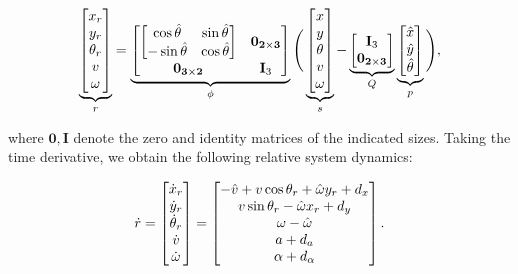 \begin{equation}\small
\label{eq:5D_and_3D_err_state}
\underbrace{
\begin{bmatrix}
x_r\\
y_r\\
\theta_r \\
v \\
\omega
\end{bmatrix}
}_\rstate
=
\underbrace{
\begin{bmatrix}
  \begin{bmatrix}
  \cos\hat\theta & \sin\hat\theta \\
  -\sin\hat\theta & \cos\hat\theta
  \end{bmatrix} & \mathbf{0_{2\times 3}} \\
  \mathbf{0_{3\times 2}} & \mathbf I_3
\end{bmatrix}
}_\rtrans
\Bigg(
\underbrace{
\begin{bmatrix}
x\\
y\\
\theta \\
v \\
\omega
\end{bmatrix}
}_\tstate -
\underbrace{
\begin{bmatrix}
\mathbf I_3 \\
\mathbf{0_{2\times 3}}
\end{bmatrix}
}_\ptmat
\underbrace{
\begin{bmatrix}
\hat x\\
\hat y \\
\hat \theta \\
\end{bmatrix}
}_\pstate
\Bigg),
\end{equation}

\noindent where $\mathbf 0, \mathbf I$ denote the zero and identity matrices of the indicated sizes.
Taking the time derivative, we obtain the following relative system dynamics:

\begin{equation}
\label{eq:5D_and_3D_rdyn}
\dot \rstate = 
\begin{bmatrix}
\dot x_r\\
\dot y_r\\
\dot\theta_r\\
\dot v\\
\dot \omega
\end{bmatrix}
=
\begin{bmatrix}
- \hat v + v \cos \theta_r + \hat \omega y_r + \dstb_x\\
v \sin \theta_r - \hat \omega x_r + \dstb_y\\
\omega - \hat \omega \\
a + \dstb_a\\
\alpha + \dstb_\alpha
\end{bmatrix}.
\end{equation}

